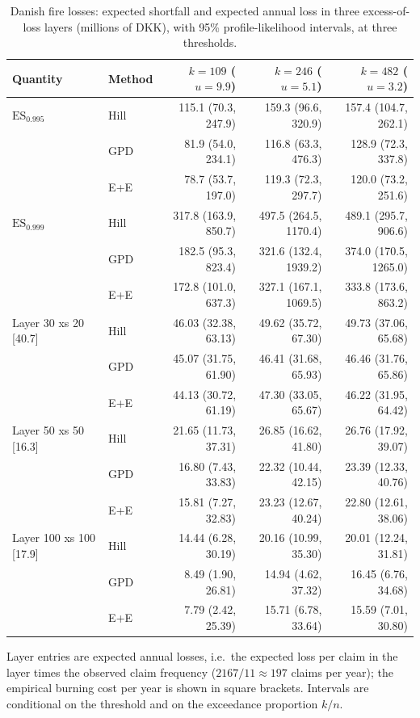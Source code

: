 \begin{table}[t]
\centering
\footnotesize
\setlength{\tabcolsep}{4pt}
\caption{Danish fire losses: expected shortfall and expected annual loss in three excess-of-loss layers (millions of DKK), with 95\% profile-likelihood intervals, at three thresholds.}
\label{tab:danishrisk}
\begin{tabular}{llrrr}
\toprule
Quantity & Method & $k=109$ ($u=9.9$) & $k=246$ ($u=5.1$) & $k=482$ ($u=3.2$) \\
\midrule
$\mathrm{ES}_{0.995}$ & Hill & 115.1 (70.3, 247.9) & 159.3 (96.6, 320.9) & 157.4 (104.7, 262.1) \\
 & GPD & 81.9 (54.0, 234.1) & 116.8 (63.3, 476.3) & 128.9 (72.3, 337.8) \\
 & E+E & 78.7 (53.7, 197.0) & 119.3 (72.3, 297.7) & 120.0 (73.2, 251.6) \\
\addlinespace
$\mathrm{ES}_{0.999}$ & Hill & 317.8 (163.9, 850.7) & 497.5 (264.5, 1170.4) & 489.1 (295.7, 906.6) \\
 & GPD & 182.5 (95.3, 823.4) & 321.6 (132.4, 1939.2) & 374.0 (170.5, 1265.0) \\
 & E+E & 172.8 (101.0, 637.3) & 327.1 (167.1, 1069.5) & 333.8 (173.6, 863.2) \\
\addlinespace
Layer 30 xs 20 [40.7] & Hill & 46.03 (32.38, 63.13) & 49.62 (35.72, 67.30) & 49.73 (37.06, 65.68) \\
 & GPD & 45.07 (31.75, 61.90) & 46.41 (31.68, 65.93) & 46.46 (31.76, 65.86) \\
 & E+E & 44.13 (30.72, 61.19) & 47.30 (33.05, 65.67) & 46.22 (31.95, 64.42) \\
\addlinespace
Layer 50 xs 50 [16.3] & Hill & 21.65 (11.73, 37.31) & 26.85 (16.62, 41.80) & 26.76 (17.92, 39.07) \\
 & GPD & 16.80 (7.43, 33.83) & 22.32 (10.44, 42.15) & 23.39 (12.33, 40.76) \\
 & E+E & 15.81 (7.27, 32.83) & 23.23 (12.67, 40.24) & 22.80 (12.61, 38.06) \\
\addlinespace
Layer 100 xs 100 [17.9] & Hill & 14.44 (6.28, 30.19) & 20.16 (10.99, 35.30) & 20.01 (12.24, 31.81) \\
 & GPD & 8.49 (1.90, 26.81) & 14.94 (4.62, 37.32) & 16.45 (6.76, 34.68) \\
 & E+E & 7.79 (2.42, 25.39) & 15.71 (6.78, 33.64) & 15.59 (7.01, 30.80) \\
\bottomrule
\end{tabular}
\par\smallskip
\parbox{\linewidth}{\footnotesize Layer entries are expected annual losses, i.e.\ the expected loss per claim in the layer times the observed claim frequency ($2167/11\approx197$ claims per year); the empirical burning cost per year is shown in square brackets. Intervals are conditional on the threshold and on the exceedance proportion $k/n$.}
\end{table}

